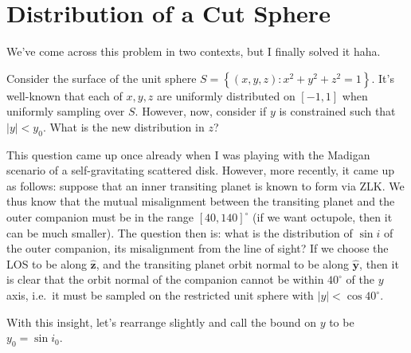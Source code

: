 \documentclass[12pt]{article}
\newcommand*{\bm}[1]{\boldsymbol{\mathbf{#1}}}
\newcommand*{\uv}[1]{\hat{\bm{#1}}}
\newcommand*{\abs}[1]{\left|#1\right|}
\newcommand*{\s}[1]{\left[#1\right]}
\newcommand*{\z}[1]{\left\{#1\right\}}
\begin{document}
\section{Distribution of a Cut Sphere}

We've come across this problem in two contexts, but I finally solved it haha.

Consider the surface of the unit sphere $S = \z{(x, y, z): x^2 + y^2 + z^2 =
1}$. It's well-known that each of $x, y, z$ are uniformly distributed on $[-1,
1]$ when uniformly sampling over $S$. However, now, consider if $y$ is
constrained such that $\abs{y} < y_0$. What is the new distribution in $z$?

This question came up once already when I was playing with the Madigan scenario
of a self-gravitating scattered disk. However, more recently, it came up as
follows: suppose that an inner transiting planet is known to form via ZLK\@. We
thus know that the mutual misalignment between the transiting planet and the
outer companion must be in the range $\s{40, 140}^\circ$ (if we want octupole,
then it can be much smaller). The question then is: what is the distribution of
$\sin i$ of the outer companion, its misalignment from the line of sight? If we
choose the LOS to be along $\uv{z}$, and the transiting planet orbit normal to
be along $\uv{y}$, then it is clear that the orbit normal of the companion
cannot be within $40^\circ$ of the $y$ axis, i.e.\ it must be sampled on the
restricted unit sphere with $\abs{y} < \cos 40^\circ$.

With this insight, let's rearrange slightly and call the bound on $y$ to be $y_0
= \sin i_0$.
\end{document}
